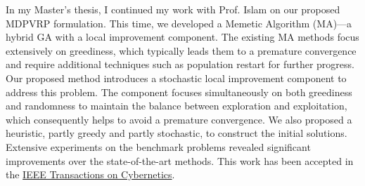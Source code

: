 \documentclass[12pt]{article}
\begin{document}
In my Master's thesis, I continued my work with Prof. Islam on our proposed MDPVRP formulation. This time, we developed a Memetic Algorithm (MA)---a hybrid GA with a local improvement component. The existing MA methods focus extensively on greediness, which typically leads them to a premature convergence and require additional techniques such as population restart for further progress. Our proposed method introduces a stochastic local improvement component to address this problem. The component focuses simultaneously on both greediness and randomness to maintain the balance between exploration and exploitation, which consequently helps to avoid a premature convergence. We also proposed a heuristic, partly greedy and partly stochastic, to construct the initial solutions. Extensive experiments on the benchmark problems revealed significant improvements over the state-of-the-art methods. This work has been accepted in the \href{http://ieeexplore.ieee.org/document/7835722/}{IEEE Transactions on Cybernetics}. 
\end{document}
